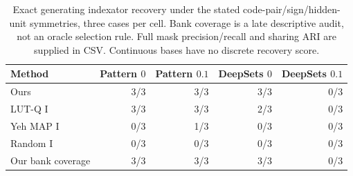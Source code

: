 \begin{table}[htbp]
\centering\small
\begin{tabular}{lrrrr}
\toprule
Method & Pattern $0$ & Pattern $0.1$ & DeepSets $0$ & DeepSets $0.1$\\
\midrule
Ours & 3/3 & 3/3 & 3/3 & 0/3\\
LUT-Q I & 3/3 & 3/3 & 2/3 & 0/3\\
Yeh MAP I & 0/3 & 1/3 & 0/3 & 0/3\\
Random I & 0/3 & 0/3 & 0/3 & 0/3\\
Our bank coverage & 3/3 & 3/3 & 3/3 & 0/3\\
\bottomrule\end{tabular}
\caption{Exact generating indexator recovery under the stated code-pair/sign/hidden-unit symmetries, three cases per cell. Bank coverage is a late descriptive audit, not an oracle selection rule. Full mask precision/recall and sharing ARI are supplied in CSV. Continuous bases have no discrete recovery score.}
\label{tab:benchmark-recovery}
\end{table}
